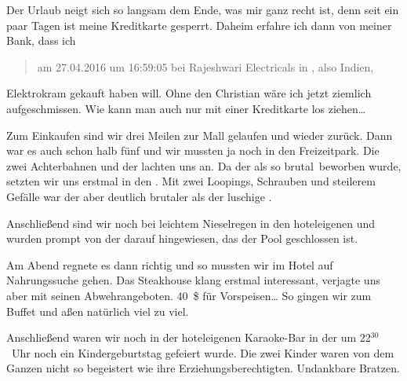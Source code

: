 Der Urlaub neigt sich so langsam dem Ende, was mir ganz recht ist, denn seit ein paar Tagen ist meine Kreditkarte gesperrt.
Daheim erfahre ich dann von meiner Bank, dass ich
\begin{quote}
	am 27.04.2016 um 16:59:05 bei Rajeshwari Electricals in , also Indien, 
\end{quote}
Elektrokram gekauft haben will.
Ohne den Christian wäre ich jetzt ziemlich aufgeschmissen.
Wie kann man auch nur mit einer Kreditkarte los ziehen\dots

Zum Einkaufen sind wir drei Meilen zur Mall gelaufen und wieder zurück.
Dann war es auch schon halb fünf und wir mussten ja noch in den  Freizeitpark.
Die zwei Achterbahnen  und der  lachten uns an.
Da der  als so \glqq brutal\grqq \, beworben wurde, setzten wir uns erstmal in den .
Mit zwei Loopings, Schrauben und steilerem Gefälle war der aber deutlich brutaler als der luschige .

Anschließend sind wir noch bei leichtem Nieselregen in den hoteleigenen  und wurden prompt von der  darauf hingewiesen, das der Pool geschlossen ist.

Am Abend regnete es dann richtig und so mussten wir im Hotel auf Nahrungssuche gehen.
Das Steakhouse klang erstmal interessant, verjagte uns aber mit seinen Abwehrangeboten.
40~\$ für Vorspeisen\dots
So gingen wir zum Buffet und aßen natürlich viel zu viel.

Anschließend waren wir noch in der hoteleigenen Karaoke-Bar in der um 22$^{30}$~Uhr noch ein Kindergeburtstag gefeiert wurde.
Die zwei Kinder waren von dem Ganzen nicht so begeistert wie ihre Erziehungsberechtigten.
Undankbare Bratzen.

